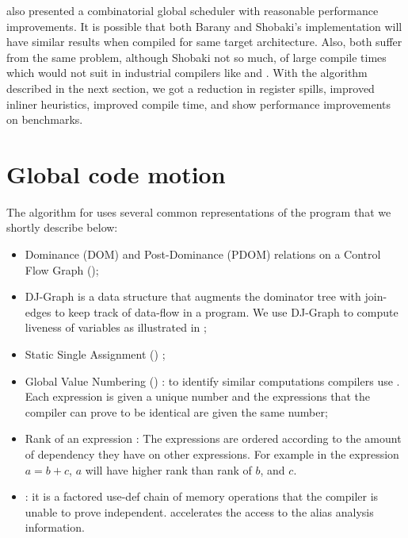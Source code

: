 \documentclass[sigplan,10pt,review,anonymous]{acmart}\settopmatter{printfolios=true,printccs=false,printacmref=false}
\begin{document}
\citet{shobaki2013} also presented a combinatorial global scheduler with
reasonable performance improvements. It is possible that both Barany and
Shobaki's implementation will have similar results when compiled for same target
architecture. Also, both suffer from the same problem, although Shobaki not so
much, of large compile times which would not suit in industrial compilers like
\GCC{} and \LLVM{}. With the algorithm described in the next section, we got a
reduction in register spills, improved inliner heuristics, improved compile
time, and show performance improvements on \SPEC{} benchmarks.


\section{Global code motion}

The algorithm for \GCM{} uses several common representations of the
program that we shortly describe below:
\begin{itemize}[leftmargin=*,topsep=0pt]
\item Dominance (DOM) and Post-Dominance (PDOM) relations \cite{dragonbook} on a
  Control Flow Graph (\CFG{});
\item DJ-Graph \cite{Sreedhar1996} is a data structure that augments the
  dominator tree with join-edges to keep track of data-flow in a program. We use
  DJ-Graph to compute liveness of variables as illustrated in \cite{das2012};
\item Static Single Assignment (\SSA{}) \cite{cytron};
\item Global Value Numbering (\GVN{}) \cite{rosen1988global,click1995global}: to
  identify similar computations compilers use \GVN{}.  Each expression is given
  a unique number and the expressions that the compiler can prove to be
  identical are given the same number;
\item Rank of an expression \cite{rosen1988global}: The expressions are ordered
  according to the amount of dependency they have on other expressions.  For
  example in the expression $a = b+c$, $a$ will have higher rank than rank of
  $b$, and $c$.
\item \MemorySSA{} \cite{novillo2007memory}: it is a factored use-def chain of
  memory operations that the compiler is unable to prove
  independent. \MemorySSA{} accelerates the access to the alias analysis
  information.
\end{itemize}
\end{document}
